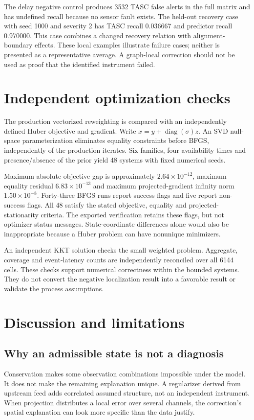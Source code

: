 \documentclass[11pt,a4paper]{article}
\begin{document}
The delay negative control produces 3532 TASC false alerts in the full matrix and has undefined recall because no sensor fault exists. The held-out recovery case with seed 1000 and severity 2 has TASC recall 0.036667 and predictor recall 0.970000. This case combines a changed recovery relation with alignment-boundary effects. These local examples illustrate failure cases; neither is presented as a representative average. A graph-local correction should not be used as proof that the identified instrument failed.

\section{Independent optimization checks}
The production vectorized reweighting is compared with an independently defined Huber objective and gradient. Write $x=y+\operatorname{diag}(\sigma)z$. An SVD null-space parameterization eliminates equality constraints before BFGS, independently of the production iterates. Six families, four availability times and presence/absence of the prior yield 48 systems with fixed numerical seeds.

Maximum absolute objective gap is approximately $2.64\times10^{-12}$, maximum equality residual $6.83\times10^{-13}$ and maximum projected-gradient infinity norm $1.50\times10^{-8}$. Forty-three BFGS runs report success flags and five report non-success flags. All 48 satisfy the stated objective, equality and projected-stationarity criteria. The exported verification retains these flags, but not optimizer status messages. State-coordinate differences alone would also be inappropriate because a Huber problem can have nonunique minimizers.

An independent KKT solution checks the small weighted problem. Aggregate, coverage and event-latency counts are independently reconciled over all 6144 cells. These checks support numerical correctness within the bounded systems. They do not convert the negative localization result into a favorable result or validate the process assumptions.

\section{Discussion and limitations}
\subsection{Why an admissible state is not a diagnosis}
Conservation makes some observation combinations impossible under the model. It does not make the remaining explanation unique. A regularizer derived from upstream feed adds correlated assumed structure, not an independent instrument. When projection distributes a local error over several channels, the correction's spatial explanation can look more specific than the data justify.
\end{document}
